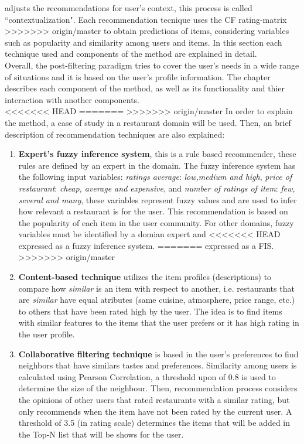 adjusts the  recommendations for user's context, this process is called
``contextualization". 
Each recommendation tecnique uses the CF rating-matrix 
>>>>>>> origin/master
to obtain  predictions of items, considering variables such as
popularity and similarity among users and items. In this section
each technique used and components of the method are explained in
detail.\\  Overall, the 
post-filtering paradigm tries to cover the  user's needs in a wide range of
situations and it is based on the user's profile information. The
chapter describes  each component of the  method, as well as its
functionality and thier interaction with  another components.\\ 
<<<<<<< HEAD
=======
>>>>>>> origin/master
In order to explain the method, a case of study in a
restaurant   domain will be used. Then, an brief description of
recommendation  techniques are also explained: 
\begin{enumerate} 
\item \textbf{Expert's fuzzy inference system}, 
this is a rule based recommender, these rules are defined by 
an expert in the domain. The
fuzzy inference system has the following input variables:
\textit{ratings average}:  \textit{low,medium and high}, \textit{price
of restaurant}:  \textit{cheap, average and expensive}, and
\textit{number of ratings of item}:  \textit{few, several and many},
these variables represent fuzzy values and are used to infer how
relevant a restaurant is for the  user. This recommendation is based
on the popularity of each  item in the user community. For other
domains, fuzzy variables must be identified by a domian expert and
<<<<<<< HEAD
expressed as a fuzzy inference system.
=======
expressed as a FIS.
>>>>>>> origin/master
\item \textbf{Content-based technique} 
utilizes the item profiles (descriptions) to compare how
\textit{similar} is an item with respect to  another, i.e. restaurants
that are \textit{similar} have equal atributes (same cuisine,  atmosphere, price range,
etc.) to others that have been rated high by the user.  The idea is to find items
with similar features to the items that the  user prefers or it has
high rating in the user profile. 
\item \textbf{Collaborative filtering technique} 
is based in the user's preferences  to find neighbors that
have similars tastes and preferences. Similarity among users is
calculated using Pearson Correlation, a threshold upon of 0.8 is used
to determine the size of the neighbour. Then, recommendation process
considers the opinions of other users that rated restaurants with a
similar rating, but only recommends when the item have not been rated
by the current user. A threshold of 3.5 (in rating scale) determines
the items that will be added in the Top-N list that will be shows for
the user. 
\end{enumerate}  
